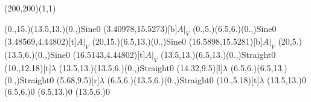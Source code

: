 \unitlength=1bp%

\begin{feynartspicture}(200,200)(1,1)

\FADiagram{}
\FAProp(0.,15.)(13.5,13.)(0.,){Sine}{0}
\FALabel(3.40978,15.5273)[b]{$A|_V$}
\FAProp(0.,5.)(6.5,6.)(0.,){Sine}{0}
\FALabel(3.48569,4.44802)[t]{$A|_V$}
\FAProp(20,15.)(6.5,13.)(0.,){Sine}{0}
\FALabel(16.5898,15.5281)[b]{$A|_V$}
\FAProp(20,5.)(13.5,6.)(0.,){Sine}{0}
\FALabel(16.5143,4.44802)[t]{$A|_V$}
\FAProp(13.5,13.)(6.5,13.)(0.,){Straight}{0}
\FALabel(10.,12.18)[t]{$\lambda$}
\FAProp(13.5,13.)(13.5,6.)(0.,){Straight}{0}
\FALabel(14.32,9.5)[l]{$\lambda$}
\FAProp(6.5,6.)(6.5,13.)(0.,){Straight}{0}
\FALabel(5.68,9.5)[r]{$\lambda$}
\FAProp(6.5,6.)(13.5,6.)(0.,){Straight}{0}
\FALabel(10.,5.18)[t]{$\lambda$}
\FAVert(13.5,13.){0}
\FAVert(6.5,6.){0}
\FAVert(6.5,13.){0}
\FAVert(13.5,6.){0}
\end{feynartspicture}

